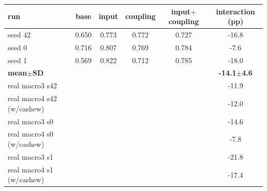 \setlength{\tabcolsep}{3pt}
\begin{tabular}{@{}lccccc@{}}
\toprule
run & base & input & coupling & input$+$coupling & interaction (pp) \\
\midrule
seed 42 & 0.650 & 0.773 & 0.772 & 0.727 & -16.8 \\
seed 0 & 0.716 & 0.807 & 0.769 & 0.784 & -7.6 \\
seed 1 & 0.569 & 0.822 & 0.712 & 0.785 & -18.0 \\
\textbf{mean$\pm$SD} &  &  &  &  & \textbf{-14.1$\pm$4.6} \\
real macro3 s42 &  &  &  &  & -11.9 \\
real macro4 s42 (w/cashew) &  &  &  &  & -12.0 \\
real macro3 s0 &  &  &  &  & -14.6 \\
real macro4 s0 (w/cashew) &  &  &  &  & -7.8 \\
real macro3 s1 &  &  &  &  & -21.8 \\
real macro4 s1 (w/cashew) &  &  &  &  & -17.4 \\
\bottomrule
\end{tabular}
